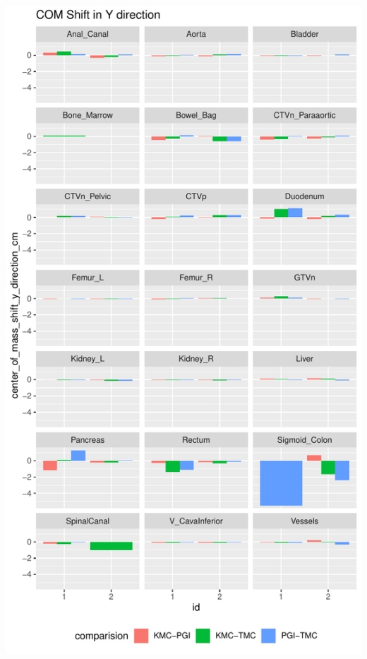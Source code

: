 \documentclass[
  letterpaper,
  DIV=11,
  numbers=noendperiod]{scrartcl}
\begin{document}
\includegraphics{analysis_files/figure-pdf/unnamed-chunk-9-1.pdf}
\end{document}
